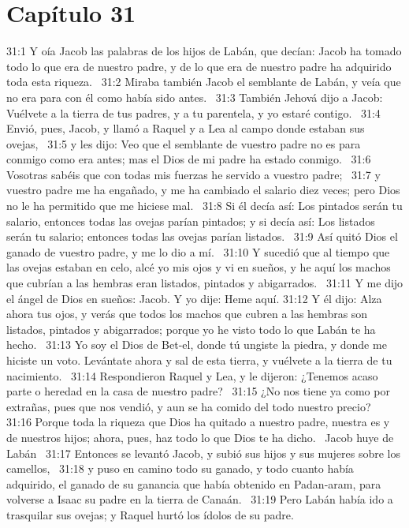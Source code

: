 \section*{Capítulo 31 }

31:1 Y oía Jacob las palabras de los hijos de Labán, que decían: Jacob ha tomado todo lo que era de nuestro padre, y de lo que era de nuestro padre ha adquirido toda esta riqueza.  
31:2 Miraba también Jacob el semblante de Labán, y veía que no era para con él como había sido antes.  
31:3 También Jehová dijo a Jacob: Vuélvete a la tierra de tus padres, y a tu parentela, y yo estaré contigo.  
31:4 Envió, pues, Jacob, y llamó a Raquel y a Lea al campo donde estaban sus ovejas,  
31:5 y les dijo: Veo que el semblante de vuestro padre no es para conmigo como era antes; mas el Dios de mi padre ha estado conmigo.  
31:6 Vosotras sabéis que con todas mis fuerzas he servido a vuestro padre;  
31:7 y vuestro padre me ha engañado, y me ha cambiado el salario diez veces; pero Dios no le ha permitido que me hiciese mal.  
31:8 Si él decía así: Los pintados serán tu salario, entonces todas las ovejas parían pintados; y si decía así: Los listados serán tu salario; entonces todas las ovejas parían listados.  
31:9 Así quitó Dios el ganado de vuestro padre, y me lo dio a mí.  
31:10 Y sucedió que al tiempo que las ovejas estaban en celo, alcé yo mis ojos y vi en sueños, y he aquí los machos que cubrían a las hembras eran listados, pintados y abigarrados.  
31:11 Y me dijo el ángel de Dios en sueños: Jacob. Y yo dije: Heme aquí. 
31:12 Y él dijo: Alza ahora tus ojos, y verás que todos los machos que cubren a las hembras son listados, pintados y abigarrados; porque yo he visto todo lo que Labán te ha hecho.  
31:13 Yo soy el Dios de Bet-el, donde tú ungiste la piedra, y donde me hiciste un voto. Levántate ahora y sal de esta tierra, y vuélvete a la tierra de tu nacimiento.  
31:14 Respondieron Raquel y Lea, y le dijeron: ¿Tenemos acaso parte o heredad en la casa de nuestro padre?  
31:15 ¿No nos tiene ya como por extrañas, pues que nos vendió, y aun se ha comido del todo nuestro precio?  
31:16 Porque toda la riqueza que Dios ha quitado a nuestro padre, nuestra es y de nuestros hijos; ahora, pues, haz todo lo que Dios te ha dicho.  
Jacob huye de Labán  
31:17 Entonces se levantó Jacob, y subió sus hijos y sus mujeres sobre los camellos,  
31:18 y puso en camino todo su ganado, y todo cuanto había adquirido, el ganado de su ganancia que había obtenido en Padan-aram, para volverse a Isaac su padre en la tierra de Canaán.  
31:19 Pero Labán había ido a trasquilar sus ovejas; y Raquel hurtó los ídolos de su padre.  

